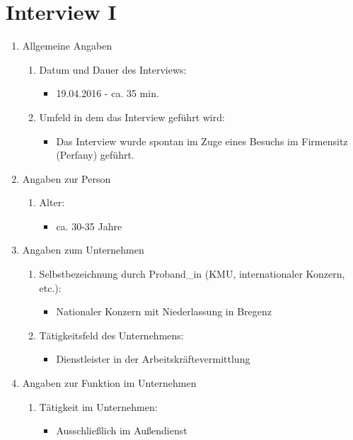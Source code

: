 \documentclass[Bachelorarbeit.tex]{subfiles}
\begin{document}
\section{Interview I}
\begin{enumerate}
	\item Allgemeine Angaben
	\begin{enumerate}
		\item Datum und Dauer des Interviews:
		\begin{itemize}
			\item[] 19.04.2016 - ca. 35 min.
		\end{itemize}
		\item Umfeld in dem das Interview geführt wird:
		\begin{itemize}
			\item[] Das Interview wurde spontan im Zuge eines Besuchs im Firmensitz (Perfany) geführt.
		\end{itemize}
	\end{enumerate}
	\item Angaben zur Person
	\begin{enumerate}
		\item Alter:
		\begin{itemize}
			\item[] ca. 30-35 Jahre
		\end{itemize}
	\end{enumerate}
	\item Angaben zum Unternehmen
	\begin{enumerate}
		\item Selbstbezeichnung durch Proband\_in  (\ac{KMU}, internationaler Konzern, etc.):
		\begin{itemize}
			\item[] Nationaler Konzern mit Niederlassung in Bregenz
		\end{itemize}
		\item Tätigkeitsfeld des Unternehmens:
		\begin{itemize}
			\item[] Dienstleister in der Arbeitskräftevermittlung
		\end{itemize}
	\end{enumerate}
	\item Angaben zur Funktion im Unternehmen
	\begin{enumerate}
		\item Tätigkeit im Unternehmen:
		\begin{itemize}
			\item[] Ausschließlich im Außendienst

\end{itemize}
\end{enumerate}
\end{enumerate}
\end{document}
